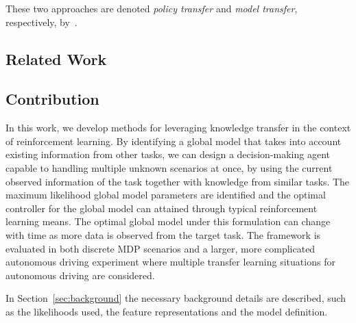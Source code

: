 These two approaches are denoted \emph{policy transfer} and \emph{model transfer}, respectively, by~\cite{zhu2020transfer}.


\subsection{Related Work}\label{sec:related}


\subsection{Contribution}
In this work, we develop methods for leveraging knowledge transfer in the context of reinforcement learning. By identifying a global model that takes into account existing information from other tasks, we can design a decision-making agent capable to handling multiple unknown scenarios at once, by using the current observed information of the task together with knowledge from similar tasks. The maximum likelihood global model parameters are identified and the optimal controller for the global model can attained through typical reinforcement learning means. The optimal global model under this formulation can change with time as more data is observed from the target task.
The framework is evaluated in both discrete MDP scenarios and a larger, more complicated autonomous driving experiment where multiple transfer learning situations for autonomous driving are considered.



In Section~\ref{sec:background} the necessary background details are described, such as the likelihoods used, the feature representations and the model definition.




